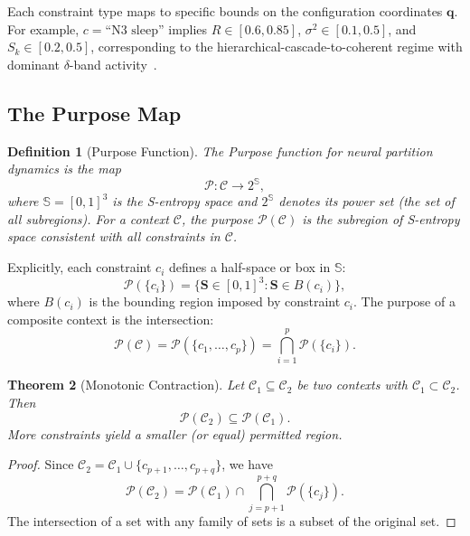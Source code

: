 \documentclass[aps,prd,twocolumn,superscriptaddress,floatfix,nofootinbib]{revtex4-2}
\newtheorem{theorem}{Theorem}[section]
\newtheorem{definition}[theorem]{Definition}
\theoremstyle{remark}
\newcommand{\Sk}{S_k}
\newcommand{\Svec}{\mathbf{S}}
\newcommand{\qvec}{\mathbf{q}}
\newcommand{\Purpose}{\mathcal{P}}
\newcommand{\Context}{\mathcal{C}}
\newcommand{\Sspace}{\mathbb{S}}
\begin{document}
Each constraint type maps to specific bounds on the configuration coordinates $\qvec$.
For example, $c = \text{``N3 sleep''}$ implies $R \in [0.6, 0.85]$, $\sigma^2 \in [0.1, 0.5]$, and $\Sk \in [0.2, 0.5]$, corresponding to the hierarchical-cascade-to-coherent regime with dominant $\delta$-band activity~\cite{sachikonye2026regime,hobson2002cognitive,carskadon2011monitoring}.

\subsection{The Purpose Map}

\begin{definition}[Purpose Function]
\label{def:purpose}
The Purpose function for neural partition dynamics is the map
\begin{equation}
\boxed{\Purpose\colon \Context \to 2^{\Sspace},}
\label{eq:purpose}
\end{equation}
where $\Sspace = [0,1]^3$ is the S-entropy space and $2^{\Sspace}$ denotes its power set (the set of all subregions).
For a context $\Context$, the purpose $\Purpose(\Context)$ is the subregion of S-entropy space consistent with all constraints in $\Context$.
\end{definition}

Explicitly, each constraint $c_i$ defines a half-space or box in $\Sspace$:
\begin{equation}
\Purpose(\{c_i\}) = \{\Svec \in [0,1]^3 : \Svec \in B(c_i)\},
\end{equation}
where $B(c_i)$ is the bounding region imposed by constraint $c_i$.
The purpose of a composite context is the intersection:
\begin{equation}
\Purpose(\Context) = \Purpose(\{c_1, \ldots, c_p\}) = \bigcap_{i=1}^{p} \Purpose(\{c_i\}).
\label{eq:purpose_intersection}
\end{equation}

\begin{theorem}[Monotonic Contraction]
\label{thm:contraction}
Let $\Context_1 \subseteq \Context_2$ be two contexts with $\Context_1 \subset \Context_2$.
Then
\begin{equation}
\Purpose(\Context_2) \subseteq \Purpose(\Context_1).
\end{equation}
More constraints yield a smaller (or equal) permitted region.
\end{theorem}

\begin{proof}
Since $\Context_2 = \Context_1 \cup \{c_{p+1}, \ldots, c_{p+q}\}$, we have
\[
\Purpose(\Context_2) = \Purpose(\Context_1) \cap \bigcap_{j=p+1}^{p+q} \Purpose(\{c_j\}).
\]
The intersection of a set with any family of sets is a subset of the original set.
\end{proof}
\end{document}
